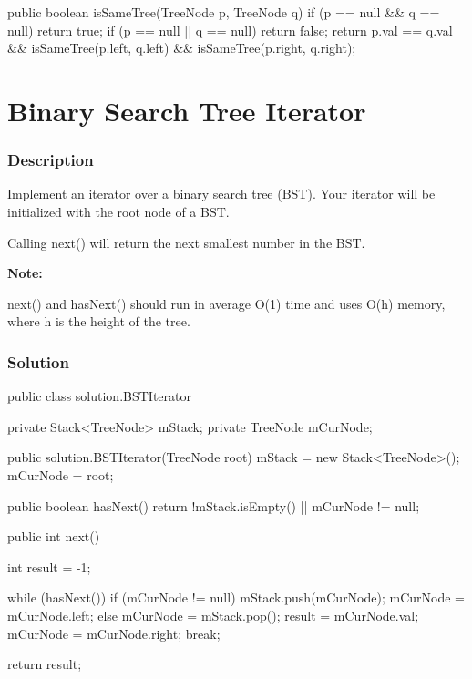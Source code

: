 \begin{Code}
public boolean isSameTree(TreeNode p, TreeNode q) {
    if (p == null && q == null) {
        return true;
    }
    if (p == null || q == null) {
        return false;
    }
    return p.val == q.val && isSameTree(p.left, q.left) && isSameTree(p.right, q.right);
}
\end{Code}

\newpage

\section{Binary Search Tree Iterator} %

\subsubsection{Description}

Implement an iterator over a binary search tree (BST). Your iterator will be initialized with the root node of a BST.

Calling next() will return the next smallest number in the BST.

\textbf{Note:}

next() and hasNext() should run in average O(1) time and uses O(h) memory, where h is the height of the tree.

\subsubsection{Solution}

\begin{Code}
public class solution.BSTIterator {

    private Stack<TreeNode> mStack;
    private TreeNode mCurNode;

    public solution.BSTIterator(TreeNode root) {
        mStack = new Stack<TreeNode>();
        mCurNode = root;
    }

    public boolean hasNext() {
        return !mStack.isEmpty() || mCurNode != null;
    }

    public int next() {
        int result = -1;

        while (hasNext()) {
            if (mCurNode != null) {
                mStack.push(mCurNode);
                mCurNode = mCurNode.left;
            } else {
                mCurNode = mStack.pop();
                result = mCurNode.val;
                mCurNode = mCurNode.right;
                break;
            }
        }

        return result;
    }
}
\end{Code}

